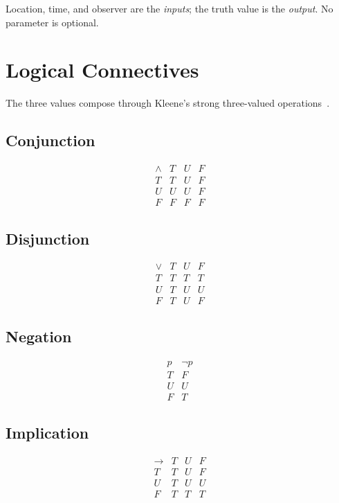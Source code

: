 \documentclass[11pt,a4paper]{article}
\begin{document}
Location, time, and observer are the \emph{inputs}; the truth value is the
\emph{output}. No parameter is optional.

\section{Logical Connectives}
The three values compose through Kleene's strong three-valued
operations~\cite{kleene1952}.

\subsection{Conjunction}
\[
\begin{array}{c|ccc}
\land & T & U & F \\ \hline
T & T & U & F \\
U & U & U & F \\
F & F & F & F
\end{array}
\]

\subsection{Disjunction}
\[
\begin{array}{c|ccc}
\lor & T & U & F \\ \hline
T & T & T & T \\
U & T & U & U \\
F & T & U & F
\end{array}
\]

\subsection{Negation}
\[
\begin{array}{c|c}
p & \lnot p \\ \hline
T & F \\
U & U \\
F & T
\end{array}
\]

\subsection{Implication}
\[
\begin{array}{c|ccc}
\to & T & U & F \\ \hline
T & T & U & F \\
U & T & U & U \\
F & T & T & T
\end{array}
\]
\end{document}
